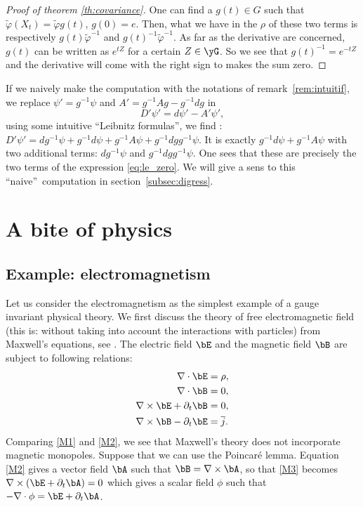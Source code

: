 \begin{proof}[Proof of theorem \ref{th:covariance}]
One can find a $g(t)\in G$ such that $\tilde{\varphi}(X_t)=\tilde{\varphi} g(t)$, $g(0)=e$. Then, what we have in the $\rho$ of these two terms is respectively $g(t)\tilde{\varphi}^{-1}$ and $g(t)^{-1}\tilde{\varphi}^{-1}$. As far as the derivative are concerned, $g(t)$ can be written as $e^{tZ}$ for a certain $Z\in\yG$. So we see that $g(t)^{-1}=e^{-tZ}$ and the derivative will come with the right sign to makes the sum zero.
\end{proof}

\begin{remark}
If we naively make the computation with the notations of remark~\ref{rem:intuitif}, we replace $\psi'=g^{-1}\psi$ and $A'=g^{-1} Ag-g^{-1} dg$ in
\[
  D'\psi'=d\psi'-A'\psi',
\]
using some intuitive ``Leibnitz formulas'', we find :
$D'\psi'=dg^{-1}\psi+g^{-1} d\psi+g^{-1} A\psi+g^{-1} dg g^{-1}\psi$. It is exactly $g^{-1} d\psi+g^{-1} A\psi$ with two additional terms: $dg^{-1}\psi$ and $g^{-1} dg g^{-1}\psi$. One sees that these are precisely the two terms of the expression \eqref{eq:le_zero}. We will give a sens to this ``naive''\ computation in section~\ref{subsec:digress}.
\end{remark}
\section{A bite of physics}

\subsection{Example: electromagnetism}

Let us consider the electromagnetism as the simplest example of a gauge invariant physical theory. We first discuss the theory of free electromagnetic field (this is: without taking into account the interactions with particles) from Maxwell's equations, see \cite{Schomblond_em,llf}. The electric field $\bE$ and the magnetic field $\bB$ are subject to following relations:
\begin{subequations}
\begin{align}
\nabla\cdot{\bE}&=\rho,    \label{M1}\\
\nabla\cdot{\bB}&=0,                     \label{M2}  \\
\nabla\times{\bE}+\partial_t{\bB}&=0,         \label{M3}\\
\nabla\times{\bB}-\partial_t{\bE}&=\overline{ j }. \label{M4}
\end{align}
\end{subequations}
Comparing \eqref{M1} and \eqref{M2}, we see that Maxwell's theory does not incorporate magnetic monopoles.
Suppose that we can use the Poincaré lemma. Equation \eqref{M2} gives a vector field $\bA$ such that $\bB=\nabla\times\bA$, so that \eqref{M3} becomes $\nabla\times(\bE+\partial_t\bA)=0$ which gives a scalar field $\phi$ such that $-\nabla\cdot\phi=\bE+\partial_t\bA$.

